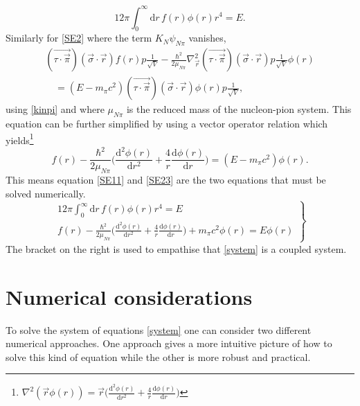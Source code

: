 \begin{equation} \label{SE11}
	12\pi \int_0^\infty  \text{d}r \, f(r) \phi(r) r^4  = E.
\end{equation}
Similarly for \eqref{SE2} where the term $K_{N}\psi_{N\pi}$ vanishes,
 \begin{equation}\begin{split}\label{SE22}
	(\vec{\tau\cdot\vec{\pi}})(\vec{\sigma}\cdot\vec{r})f(r) p \frac{1}{\sqrt{V}}-\frac{\hbar^2}{2\mu_{N\pi}} \nabla^2_{\vec{r}}(\vec{\tau\cdot\vec{\pi}})(\vec{\sigma}\cdot\vec{r}) p \frac{1}{\sqrt{V}}\phi(r) \\ \quad= (E-m_\pi c^2) (\vec{\tau\cdot\vec{\pi}})(\vec{\sigma}\cdot\vec{r}) \phi(r)p\frac{1}{\sqrt{V}},
\end{split}
\end{equation}
using \eqref{kinpi} and where $\mu_{N\pi}$ is the reduced mass of the nucleon-pion system. This equation can be further simplified by using a vector operator relation which yields\footnote{$\nabla^2(\vec{r}\phi(r))=\vec{r}\big(\frac{\text{d}^2\phi(r)}{\text{d}r^2}+\frac{4}{r}\frac{\text{d}\phi(r)}{\text{d}r}\big)$}
\begin{equation} \label{SE23}
	f(r) -\frac{\hbar^2}{2\mu_{N\pi}}\Big(\frac{\text{d}^2 \phi(r)}{\text{d}r^2}+\frac{4}{r}\frac{\text{d}\phi(r)}{\text{d}r}\Big) = (E-m_\pi c^2)\phi(r).
\end{equation}
This means equation \eqref{SE11} and \eqref{SE23} are the two equations that must be solved numerically.
\begin{equation} \label{system}
	\left.
	\begin{array}{ll}
		12\pi \int_0^\infty  \text{d}r \, f(r) \phi(r) r^4  = E \\
		f(r) -\frac{\hbar^2}{2\mu_{N\pi}}\Big(\frac{\text{d}^2 \phi(r)}{\text{d}r^2}+\frac{4}{r}\frac{\text{d}\phi(r)}{\text{d}r}\Big)+m_\pi c^2 \phi(r) = E\phi(r)
	\end{array}
	\right \} 
\end{equation}
The bracket on the right is used to empathise that \eqref{system} is a coupled system.
\section{Numerical considerations}\label{sec:numericalconsiderations}
To solve the system of equations \eqref{system} one can consider two different numerical approaches. One approach gives a more intuitive picture of how to solve this kind of equation while the other is more robust and practical.

